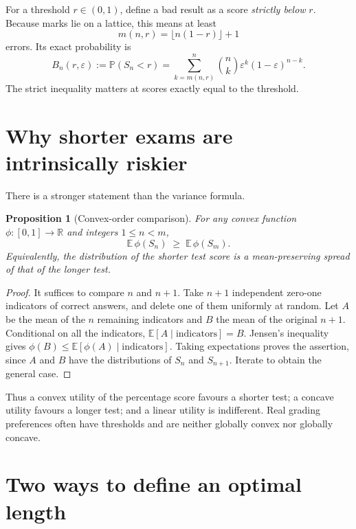 \documentclass[11pt,a4paper]{article}
\newtheorem{proposition}{Proposition}
\newcommand{\Prb}{\mathbb P}
\newcommand{\E}{\mathbb E}
\begin{document}
For a threshold $r\in(0,1)$, define a bad result as a score \emph{strictly below} $r$. Because marks lie on a lattice, this means at least
\begin{equation}
 m(n,r)=\lfloor n(1-r)\rfloor+1
 \label{eq:cutoff}
\end{equation}
errors. Its exact probability is
\begin{equation}
 B_n(r,\varepsilon):=\Prb(S_n<r)
 =\sum_{k=m(n,r)}^n {n\choose k}\varepsilon^k(1-\varepsilon)^{n-k}.
 \label{eq:bad}
\end{equation}
The strict inequality matters at scores exactly equal to the threshold.

\section{Why shorter exams are intrinsically riskier}
There is a stronger statement than the variance formula.

\begin{proposition}[Convex-order comparison]
For any convex function $\phi:[0,1]\to\mathbb R$ and integers $1\leq n<m$,
\begin{equation}
 \E\,\phi(S_n)\;\geq\;\E\,\phi(S_m).
 \label{eq:convex}
\end{equation}
Equivalently, the distribution of the shorter test score is a mean-preserving spread of that of the longer test.
\end{proposition}
\begin{proof}
It suffices to compare $n$ and $n+1$. Take $n+1$ independent zero-one indicators of correct answers, and delete one of them uniformly at random. Let $A$ be the mean of the $n$ remaining indicators and $B$ the mean of the original $n+1$. Conditional on all the indicators, $\E[A\mid\text{indicators}]=B$. Jensen's inequality gives $\phi(B)\leq\E[\phi(A)\mid\text{indicators}]$. Taking expectations proves the assertion, since $A$ and $B$ have the distributions of $S_n$ and $S_{n+1}$. Iterate to obtain the general case.
\end{proof}

Thus a convex utility of the percentage score favours a shorter test; a concave utility favours a longer test; and a linear utility is indifferent. Real grading preferences often have thresholds and are neither globally convex nor globally concave.

\section{Two ways to define an optimal length}
\end{document}
